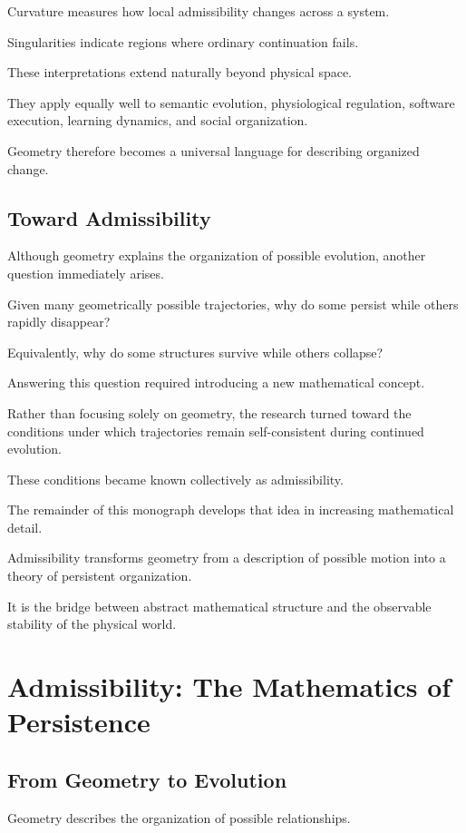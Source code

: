 \documentclass[11pt,oneside]{book}
\numberwithin{equation}{chapter}
\theoremstyle{definition}
\theoremstyle{plain}
\begin{document}
Curvature measures how local admissibility changes across a system.

Singularities indicate regions where ordinary continuation fails.

These interpretations extend naturally beyond physical space.

They apply equally well to semantic evolution, physiological regulation,
software execution, learning dynamics, and social organization.

Geometry therefore becomes a universal language for describing organized
change.

\section{Toward Admissibility}

Although geometry explains the organization of possible evolution, another
question immediately arises.

Given many geometrically possible trajectories, why do some persist while
others rapidly disappear?

Equivalently, why do some structures survive while others collapse?

Answering this question required introducing a new mathematical concept.

Rather than focusing solely on geometry, the research turned toward the
conditions under which trajectories remain self-consistent during continued
evolution.

These conditions became known collectively as admissibility.

The remainder of this monograph develops that idea in increasing
mathematical detail.

Admissibility transforms geometry from a description of possible motion into
a theory of persistent organization.

It is the bridge between abstract mathematical structure and the observable
stability of the physical world.

\chapter{Admissibility: The Mathematics of Persistence}

\section{From Geometry to Evolution}

Geometry describes the organization of possible relationships.
\end{document}
